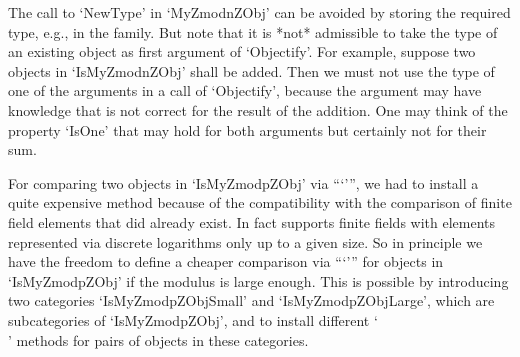 The call to `NewType' in `MyZmodnZObj' can be avoided by storing
the required type, e.g., in the family.
But note that it is *not* admissible to take the type of an existing
object as first argument of `Objectify'.
For example, suppose two objects in `IsMyZmodnZObj' shall be added.
Then we must not use the type of one of the arguments in a call of
`Objectify', because the argument may have knowledge that is not
correct for the result of the addition.
One may think of the property `IsOne' that may hold for both
arguments but certainly not for their sum.

For comparing two objects in `IsMyZmodpZObj' via ```\<''',
we had to install a quite expensive method because of the compatibility
with the comparison of finite field elements that did already exist.
In fact {\GAP} supports finite fields with elements represented via
discrete logarithms only up to a given size.
So in principle we have the freedom to define a cheaper comparison
via ```\<''' for objects in `IsMyZmodpZObj' if the modulus is large
enough.
This is possible by introducing two categories `IsMyZmodpZObjSmall'
and `IsMyZmodpZObjLarge', which are subcategories of `IsMyZmodpZObj',
and to install different `\\\<' methods for pairs of objects
in these categories.



